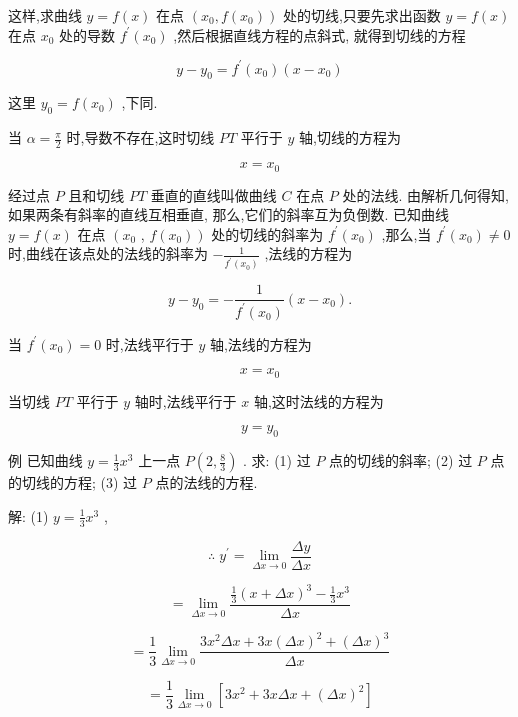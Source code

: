 \documentclass[lang=cn,newtx,12pt,scheme=chinese]{elegantbook}
\begin{document}
这样,求曲线 \(y = f\left( x\right)\) 在点 \(\left( {{x}_{0},f\left( {x}_{0}\right) }\right)\) 处的切线,只要先求出函数 \(y = f\left( x\right)\) 在点 \({x}_{0}\) 处的导数 \({f}^{\prime }\left( {x}_{0}\right)\) ,然后根据直线方程的点斜式, 就得到切线的方程

\[
y - {y}_{0} = {f}^{\prime }\left( {x}_{0}\right) \left( {x - {x}_{0}}\right)
\]

这里 \({y}_{0} = f\left( {x}_{0}\right)\) ,下同.

当 \(\alpha = \frac{\pi }{2}\) 时,导数不存在,这时切线 \({PT}\) 平行于 \(y\) 轴,切线的方程为

\[
x = {x}_{0}
\]

经过点 \(P\) 且和切线 \({PT}\) 垂直的直线叫做曲线 \(C\) 在点 \(P\) 处的法线. 由解析几何得知, 如果两条有斜率的直线互相垂直, 那么,它们的斜率互为负倒数. 已知曲线 \(y = f\left( x\right)\) 在点 \(\left( {x}_{0}\right.\) , \(\left. {f\left( {x}_{0}\right) }\right)\) 处的切线的斜率为 \({f}^{\prime }\left( {x}_{0}\right)\) ,那么,当 \({f}^{\prime }\left( {x}_{0}\right) \neq 0\) 时,曲线在该点处的法线的斜率为 \(- \frac{1}{{f}^{\prime }\left( {x}_{0}\right) }\) ,法线的方程为

\[
y - {y}_{0} = - \frac{1}{{f}^{\prime }\left( {x}_{0}\right) }\left( {x - {x}_{0}}\right) .
\]

当 \({f}^{\prime }\left( {x}_{0}\right) = 0\) 时,法线平行于 \(y\) 轴,法线的方程为

\[
x = {x}_{0}
\]

当切线 \({PT}\) 平行于 \(y\) 轴时,法线平行于 \(x\) 轴,这时法线的方程为

\[
y = {y}_{0}
\]

例 已知曲线 \(y = \frac{1}{3}{x}^{3}\) 上一点 \(P\left( {2,\frac{8}{3}}\right)\) . 求: (1) 过 \(P\) 点的切线的斜率; (2) 过 \(P\) 点的切线的方程; (3) 过 \(P\) 点的法线的方程.

解: (1) \(y = \frac{1}{3}{x}^{3}\) ,

\[
\therefore \;{y}^{\prime } = \mathop{\lim }\limits_{{{\Delta x} \rightarrow 0}}\frac{\Delta y}{\Delta x}
\]

\[
= \mathop{\lim }\limits_{{{\Delta x} \rightarrow 0}}\frac{\frac{1}{3}{\left( x + \Delta x\right) }^{3} - \frac{1}{3}{x}^{3}}{\Delta x}
\]

\[
= \frac{1}{3}\mathop{\lim }\limits_{{{\Delta x} \rightarrow 0}}\frac{3{x}^{2}{\Delta x} + {3x}{\left( \Delta x\right) }^{2} + {\left( \Delta x\right) }^{3}}{\Delta x}
\]

\[
= \frac{1}{3}\mathop{\lim }\limits_{{{\Delta x} \rightarrow 0}}\left\lbrack {3{x}^{2} + {3x\Delta x} + {\left( \Delta x\right) }^{2}}\right\rbrack
\]
\end{document}
